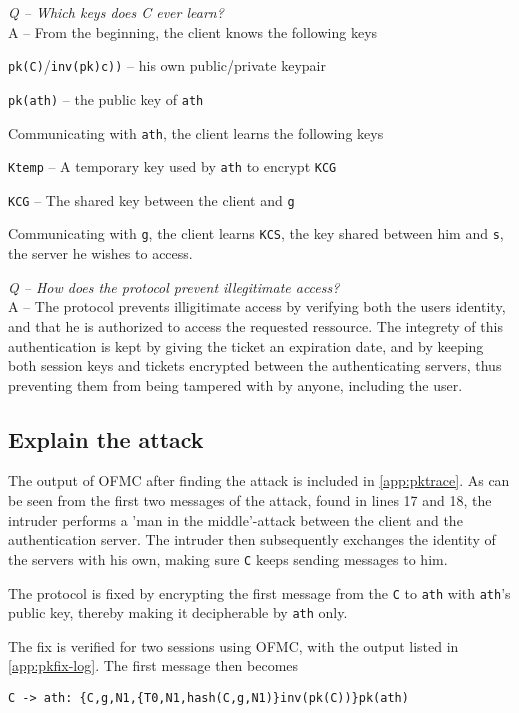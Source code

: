\documentclass{article}
\newcommand\Q[1]{
	\leavevmode\par
	\noindent
	\emph{Q -- #1}
	\\
}
\newcommand\A[1]{
	A -- #1
}
\begin{document}
\Q{Which keys does \emph{C} ever learn?}
\A{
	From the beginning, the client knows the following keys
	\begin{itemize*}
		\item \texttt{pk(C)}/\texttt{inv(pk)c))} -- his own public/private keypair
		\item \texttt{pk(ath)} -- the public key of \texttt{ath}
	\end{itemize*}
	
	Communicating with \texttt{ath}, the client learns the following keys
	\begin{itemize*}
		\item \texttt{Ktemp} -- A temporary key used by \texttt{ath} to encrypt \texttt{KCG}
		\item \texttt{KCG} -- The shared key between the client and \texttt{g}
	\end{itemize*}

	Communicating with \texttt{g}, the client learns \texttt{KCS}, the key shared
	between him and \texttt{s}, the server he wishes to access.
}

\Q{How does the protocol prevent illegitimate access?}
\A{
	The protocol prevents illigitimate access by verifying both the users
	identity, and that he is authorized to access the requested ressource.
	The integrety of this authentication is kept by giving the ticket an
	expiration date, and by keeping both session keys and tickets encrypted
	between the authenticating servers, thus preventing them from being
	tampered with by anyone, including the user.
}


\subsection{Explain the attack}
The output of OFMC after finding the attack is included in \ref{app:pktrace}.
As can be seen from the first two messages of the attack, found in lines 17 and 18,
the intruder performs a 'man in the middle'-attack between the client and
the authentication server.
The intruder then subsequently exchanges the identity of the servers with his own,
making sure \texttt{C} keeps sending messages to him.

The protocol is fixed by encrypting the first message from the \texttt{C} to \texttt{ath}
with \texttt{ath}'s public key, thereby making it decipherable by \texttt{ath} only.

The fix is verified for two sessions using OFMC, with the output listed in \ref{app:pkfix-log}.
The first message then becomes
\begin{verbatim}
C -> ath: {C,g,N1,{T0,N1,hash(C,g,N1)}inv(pk(C))}pk(ath)
\end{verbatim}
\end{document}
